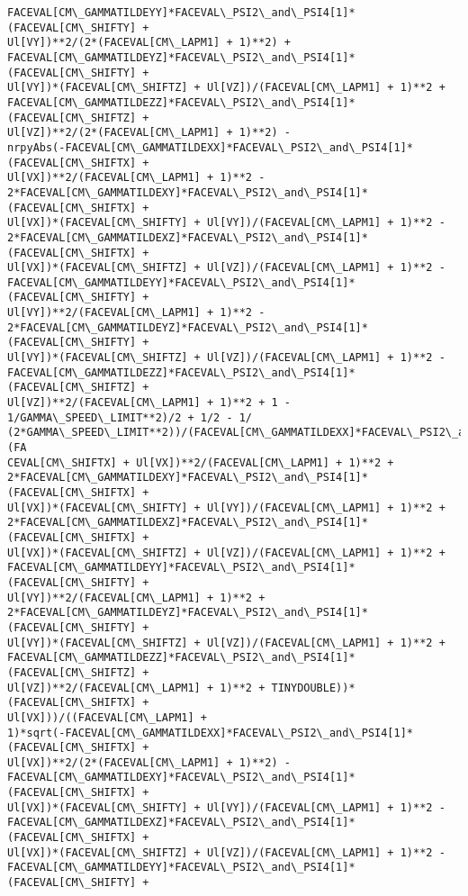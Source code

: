 \documentclass[landscape,letterpaper,10pt,english]{article}
\begin{document}
\begin{Verbatim}[commandchars=\\\{\}]
FACEVAL[CM\_GAMMATILDEYY]*FACEVAL\_PSI2\_and\_PSI4[1]*(FACEVAL[CM\_SHIFTY] +
Ul[VY])**2/(2*(FACEVAL[CM\_LAPM1] + 1)**2) +
FACEVAL[CM\_GAMMATILDEYZ]*FACEVAL\_PSI2\_and\_PSI4[1]*(FACEVAL[CM\_SHIFTY] +
Ul[VY])*(FACEVAL[CM\_SHIFTZ] + Ul[VZ])/(FACEVAL[CM\_LAPM1] + 1)**2 +
FACEVAL[CM\_GAMMATILDEZZ]*FACEVAL\_PSI2\_and\_PSI4[1]*(FACEVAL[CM\_SHIFTZ] +
Ul[VZ])**2/(2*(FACEVAL[CM\_LAPM1] + 1)**2) -
nrpyAbs(-FACEVAL[CM\_GAMMATILDEXX]*FACEVAL\_PSI2\_and\_PSI4[1]*(FACEVAL[CM\_SHIFTX] +
Ul[VX])**2/(FACEVAL[CM\_LAPM1] + 1)**2 -
2*FACEVAL[CM\_GAMMATILDEXY]*FACEVAL\_PSI2\_and\_PSI4[1]*(FACEVAL[CM\_SHIFTX] +
Ul[VX])*(FACEVAL[CM\_SHIFTY] + Ul[VY])/(FACEVAL[CM\_LAPM1] + 1)**2 -
2*FACEVAL[CM\_GAMMATILDEXZ]*FACEVAL\_PSI2\_and\_PSI4[1]*(FACEVAL[CM\_SHIFTX] +
Ul[VX])*(FACEVAL[CM\_SHIFTZ] + Ul[VZ])/(FACEVAL[CM\_LAPM1] + 1)**2 -
FACEVAL[CM\_GAMMATILDEYY]*FACEVAL\_PSI2\_and\_PSI4[1]*(FACEVAL[CM\_SHIFTY] +
Ul[VY])**2/(FACEVAL[CM\_LAPM1] + 1)**2 -
2*FACEVAL[CM\_GAMMATILDEYZ]*FACEVAL\_PSI2\_and\_PSI4[1]*(FACEVAL[CM\_SHIFTY] +
Ul[VY])*(FACEVAL[CM\_SHIFTZ] + Ul[VZ])/(FACEVAL[CM\_LAPM1] + 1)**2 -
FACEVAL[CM\_GAMMATILDEZZ]*FACEVAL\_PSI2\_and\_PSI4[1]*(FACEVAL[CM\_SHIFTZ] +
Ul[VZ])**2/(FACEVAL[CM\_LAPM1] + 1)**2 + 1 - 1/GAMMA\_SPEED\_LIMIT**2)/2 + 1/2 - 1/
(2*GAMMA\_SPEED\_LIMIT**2))/(FACEVAL[CM\_GAMMATILDEXX]*FACEVAL\_PSI2\_and\_PSI4[1]*(FA
CEVAL[CM\_SHIFTX] + Ul[VX])**2/(FACEVAL[CM\_LAPM1] + 1)**2 +
2*FACEVAL[CM\_GAMMATILDEXY]*FACEVAL\_PSI2\_and\_PSI4[1]*(FACEVAL[CM\_SHIFTX] +
Ul[VX])*(FACEVAL[CM\_SHIFTY] + Ul[VY])/(FACEVAL[CM\_LAPM1] + 1)**2 +
2*FACEVAL[CM\_GAMMATILDEXZ]*FACEVAL\_PSI2\_and\_PSI4[1]*(FACEVAL[CM\_SHIFTX] +
Ul[VX])*(FACEVAL[CM\_SHIFTZ] + Ul[VZ])/(FACEVAL[CM\_LAPM1] + 1)**2 +
FACEVAL[CM\_GAMMATILDEYY]*FACEVAL\_PSI2\_and\_PSI4[1]*(FACEVAL[CM\_SHIFTY] +
Ul[VY])**2/(FACEVAL[CM\_LAPM1] + 1)**2 +
2*FACEVAL[CM\_GAMMATILDEYZ]*FACEVAL\_PSI2\_and\_PSI4[1]*(FACEVAL[CM\_SHIFTY] +
Ul[VY])*(FACEVAL[CM\_SHIFTZ] + Ul[VZ])/(FACEVAL[CM\_LAPM1] + 1)**2 +
FACEVAL[CM\_GAMMATILDEZZ]*FACEVAL\_PSI2\_and\_PSI4[1]*(FACEVAL[CM\_SHIFTZ] +
Ul[VZ])**2/(FACEVAL[CM\_LAPM1] + 1)**2 + TINYDOUBLE))*(FACEVAL[CM\_SHIFTX] +
Ul[VX]))/((FACEVAL[CM\_LAPM1] +
1)*sqrt(-FACEVAL[CM\_GAMMATILDEXX]*FACEVAL\_PSI2\_and\_PSI4[1]*(FACEVAL[CM\_SHIFTX] +
Ul[VX])**2/(2*(FACEVAL[CM\_LAPM1] + 1)**2) -
FACEVAL[CM\_GAMMATILDEXY]*FACEVAL\_PSI2\_and\_PSI4[1]*(FACEVAL[CM\_SHIFTX] +
Ul[VX])*(FACEVAL[CM\_SHIFTY] + Ul[VY])/(FACEVAL[CM\_LAPM1] + 1)**2 -
FACEVAL[CM\_GAMMATILDEXZ]*FACEVAL\_PSI2\_and\_PSI4[1]*(FACEVAL[CM\_SHIFTX] +
Ul[VX])*(FACEVAL[CM\_SHIFTZ] + Ul[VZ])/(FACEVAL[CM\_LAPM1] + 1)**2 -
FACEVAL[CM\_GAMMATILDEYY]*FACEVAL\_PSI2\_and\_PSI4[1]*(FACEVAL[CM\_SHIFTY] +

\end{Verbatim}
\end{document}
